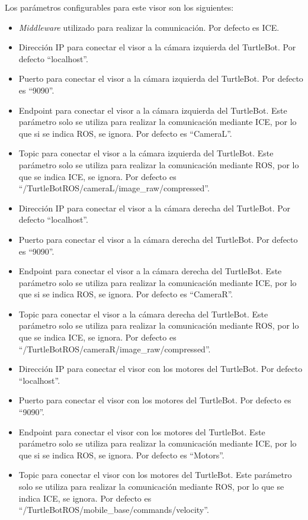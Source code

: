 Los parámetros configurables para este visor son los siguientes:
\begin{itemize}
\item \textit{Middleware} utilizado para realizar la comunicación. Por defecto es ICE.
\item Dirección IP para conectar el visor a la cámara izquierda del TurtleBot. Por defecto ``localhost''.
\item Puerto para conectar el visor a la cámara izquierda del TurtleBot. Por defecto es ``9090''.
\item Endpoint para conectar el visor a la cámara izquierda del TurtleBot. Este parámetro solo se utiliza para realizar la comunicación mediante ICE, por lo que si se indica ROS, se ignora. Por defecto es ``CameraL''.
\item Topic para conectar el visor a la cámara izquierda del TurtleBot. Este parámetro solo se utiliza para realizar la comunicación mediante ROS, por lo que se indica ICE, se ignora. Por defecto es ``/TurtleBotROS/cameraL/image\_raw/compressed''.
\item Dirección IP para conectar el visor a la cámara derecha del TurtleBot. Por defecto ``localhost''.
\item Puerto para conectar el visor a la cámara derecha del TurtleBot. Por defecto es ``9090''.
\item Endpoint para conectar el visor a la cámara derecha del TurtleBot. Este parámetro solo se utiliza para realizar la comunicación mediante ICE, por lo que si se indica ROS, se ignora. Por defecto es ``CameraR''.
\item Topic para conectar el visor a la cámara derecha del TurtleBot. Este parámetro solo se utiliza para realizar la comunicación mediante ROS, por lo que se indica ICE, se ignora. Por defecto es ``/TurtleBotROS/cameraR/image\_raw/compressed''.
\item Dirección IP para conectar el visor con los motores del TurtleBot. Por defecto ``localhost''.
\item Puerto para conectar el visor con los motores del TurtleBot. Por defecto es ``9090''.
\item Endpoint para conectar el visor con los motores del TurtleBot. Este parámetro solo se utiliza para realizar la comunicación mediante ICE, por lo que si se indica ROS, se ignora. Por defecto es ``Motors''.
\item Topic para conectar el visor con los motores del TurtleBot. Este parámetro solo se utiliza para realizar la comunicación mediante ROS, por lo que se indica ICE, se ignora. Por defecto es ``/TurtleBotROS/mobile\_base/commands/velocity''.

\end{itemize}
